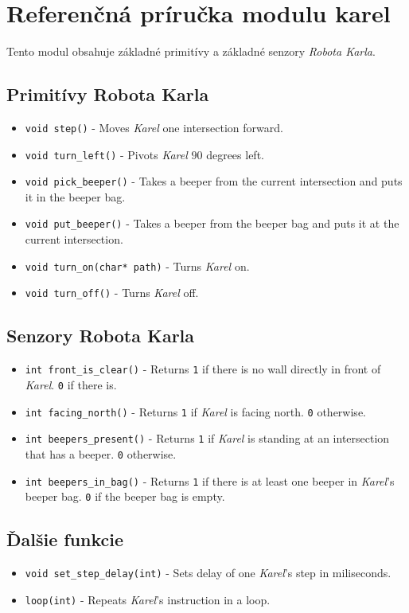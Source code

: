 
\chapter{Referenčná príručka modulu karel}\label{app:karel}

Tento modul obsahuje základné primitívy a základné senzory \emph{Robota Karla}.


\section*{Primitívy Robota Karla}

\begin{itemize}
    \item \verb|void step()| - Moves \textit{Karel} one intersection forward.
    \item \verb|void turn_left()| - Pivots \textit{Karel} $90$ degrees left.
    \item \verb|void pick_beeper()| - Takes a beeper from the current intersection and puts it in the beeper bag.
    \item \verb|void put_beeper()| - Takes a beeper from the beeper bag and puts it at the current intersection.
    \item \verb|void turn_on(char* path)| - Turns \textit{Karel} on.
    \item \verb|void turn_off()| - Turns \textit{Karel} off.
\end{itemize}


\section*{Senzory Robota Karla}

\begin{itemize}
    \item \verb|int front_is_clear()| - Returns \texttt{1} if there is no wall directly in front of \textit{Karel}. \texttt{0} if there is.
    \item \verb|int facing_north()| - Returns \texttt{1} if \textit{Karel} is facing north. \texttt{0} otherwise.
    \item \verb|int beepers_present()| - Returns \texttt{1} if \textit{Karel} is standing at an intersection that has a beeper. \texttt{0} otherwise.
    \item \verb|int beepers_in_bag()| - Returns \texttt{1} if there is at least one beeper in \textit{Karel}'s beeper bag. \texttt{0} if the beeper bag is empty.
\end{itemize}


\section*{Ďalšie funkcie}

\begin{itemize}
    \item \verb|void set_step_delay(int)| - Sets delay of one \textit{Karel}'s step in miliseconds.
    \item \verb|loop(int)| - Repeats \textit{Karel}'s instruction in a loop.
\end{itemize}
